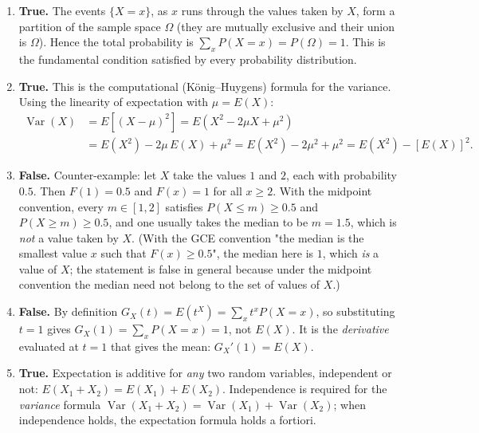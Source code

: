 \documentclass[11pt]{article}
\begin{document}
\begin{corrige}
\begin{enumerate}
\item \textbf{True.} The events $\{X = x\}$, as $x$ runs through the values taken by $X$, form a partition of the sample space $\Omega$ (they are mutually exclusive and their union is $\Omega$). Hence the total probability is $\sum_x P(X=x) = P(\Omega) = 1$. This is the fundamental condition satisfied by every probability distribution.
\item \textbf{True.} This is the computational (König–Huygens) formula for the variance. Using the linearity of expectation with $\mu = E(X)$:
\begin{align*}
\operatorname{Var}(X) &= E\!\left[(X - \mu)^2\right] = E(X^2 - 2\mu X + \mu^2) \\
&= E(X^2) - 2\mu\, E(X) + \mu^2 = E(X^2) - 2\mu^2 + \mu^2 = E(X^2) - [E(X)]^2.
\end{align*}
\item \textbf{False.} Counter-example: let $X$ take the values $1$ and $2$, each with probability $0.5$. Then $F(1) = 0.5$ and $F(x) = 1$ for all $x \ge 2$. With the midpoint convention, every $m \in [1,2]$ satisfies $P(X \le m) \ge 0.5$ and $P(X \ge m) \ge 0.5$, and one usually takes the median to be $m = 1.5$, which is \emph{not} a value taken by $X$. (With the GCE convention "the median is the smallest value $x$ such that $F(x) \ge 0.5$", the median here is $1$, which \emph{is} a value of $X$; the statement is false in general because under the midpoint convention the median need not belong to the set of values of $X$.)
\item \textbf{False.} By definition $G_X(t) = E(t^X) = \sum_x t^x P(X=x)$, so substituting $t = 1$ gives $G_X(1) = \sum_x P(X=x) = 1$, not $E(X)$. It is the \emph{derivative} evaluated at $t = 1$ that gives the mean: $G_X'(1) = E(X)$.
\item \textbf{True.} Expectation is additive for \emph{any} two random variables, independent or not: $E(X_1 + X_2) = E(X_1) + E(X_2)$. Independence is required for the \emph{variance} formula $\operatorname{Var}(X_1+X_2) = \operatorname{Var}(X_1) + \operatorname{Var}(X_2)$; when independence holds, the expectation formula holds a fortiori.
\end{enumerate}
\end{corrige}
\end{document}
